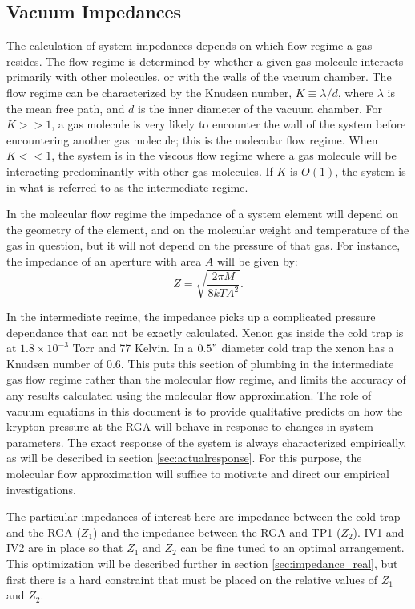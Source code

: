 \subsection{Vacuum Impedances}
The calculation of system impedances depends on which flow regime a gas resides. The flow regime is determined by whether a given gas molecule interacts primarily with other molecules, or with the walls of the vacuum chamber. The flow regime can be characterized by the Knudsen number, $K \equiv \lambda/d$, where $\lambda$ is the mean free path, and $d$ is the inner diameter of the vacuum chamber. For $K>>1$, a gas molecule is very likely to encounter the wall of the system before encountering another gas molecule; this is the molecular flow regime. When $K<<1$, the system is in the viscous flow regime where a gas molecule will be interacting predominantly with other gas molecules. If $K$ is $O(1)$, the system is in what is referred to as the intermediate regime.\cite{vac_eq}

In the molecular flow regime the impedance of a system element will depend on the geometry of the element, and on the molecular weight and temperature of the gas in question, but it will not depend on the pressure of that gas. For instance, the impedance of an aperture with area $A$ will be given by:\cite{vac_eq}
\begin{equation}
\label{eq:aperture}
Z=\sqrt{\frac{2\pi M}{8kTA^{2}}}.
\end{equation}

In the intermediate regime, the impedance picks up a complicated pressure dependance that can not be exactly calculated. Xenon gas inside the cold trap is at $1.8\times 10^{-3}$ Torr and 77 Kelvin.\cite{vaporpressure} In a $0.5"$ diameter cold trap the xenon has a Knudsen number of 0.6. This puts this section of plumbing in the intermediate gas flow regime rather than the molecular flow regime, and limits the accuracy of any results calculated using the molecular flow approximation. The role of vacuum equations in this document is to provide qualitative predicts on how the krypton pressure at the RGA will behave in response to changes in system parameters. The exact response of the system is always characterized empirically, as will be described in section \ref{sec:actualresponse}. For this purpose, the molecular flow approximation will suffice to motivate and direct our empirical investigations\cite{vac_eq}.

The particular impedances of interest here are impedance between the cold-trap and the RGA ($Z_1$) and the impedance between the RGA and TP1 ($Z_2$). IV1 and IV2 are in place so that $Z_1$ and $Z_2$ can be fine tuned to an optimal arrangement. This optimization will be described further in section \ref{sec:impedance_real}, but first there is a hard constraint that must be placed on the relative values of $Z_1$ and $Z_2$.

